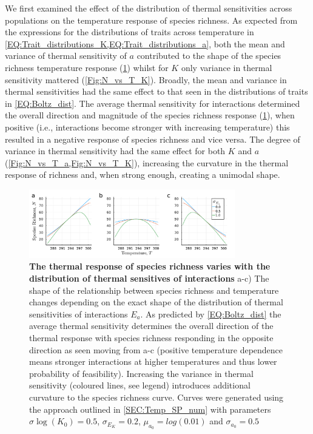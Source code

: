 \documentclass{article}
\begin{document}
We first examined the effect of the distribution of thermal sensitivities across populations on the temperature response of species richness. As expected from the expressions for the distributions of traits across temperature in \cref{EQ:Trait_distributions_K,EQ:Trait_distributions_a}, both the mean and variance of thermal sensitivity of $a$ contributed to the shape of the species richness temperature response (\cref{Fig:N_vs_T_a}) whilst for $K$ only variance in thermal sensitivity mattered (\cref{Fig:N_vs_T_K}). Broadly, the mean and variance in thermal sensitivities had the same effect to that seen in the distributions of traits in \cref{EQ:Boltz_dist}. The average thermal sensitivity for interactions determined the overall direction and magnitude of the species richness response (\cref{Fig:N_vs_T_a}), when positive (i.e., interactions become stronger with increasing temperature) this resulted in a negative response of species richness and vice versa. The degree of variance in thermal sensitivity had the same effect for both $K$ and $a$ (\cref{Fig:N_vs_T_a,Fig:N_vs_T_K}), increasing the curvature in the thermal response of richness and, when strong enough, creating a unimodal shape.

\begin{figure}
    \centering
    \includegraphics[width=0.8\textwidth]{docs/Figures/Fig_Nsp_Temp_a.pdf}
    \caption{\textbf{The thermal response of species richness  varies with the distribution of thermal sensitives of interactions} a-c) The shape of the relationship between species richness and temperature changes depending on the exact shape of the distribution of thermal sensitivities of interactions $E_a$. As predicted by \cref{EQ:Boltz_dist} the average thermal sensitivity determines the overall direction of the thermal response with species richness responding in the opposite direction as seen moving from a-c (positive temperature dependence means stronger interactions at higher temperatures and thus lower probability of feasibility). Increasing the variance in thermal sensitivity (coloured lines, see legend) introduces additional curvature to the species richness curve. Curves were generated using the approach outlined in \cref{SEC:Temp_SP_num} with parameters $\sigma{\log(K_0)} = 0.5$, $\sigma_{E_K} = 0.2$, $\mu_{a_0} = log(0.01)$ and  $\sigma_{a_0} = 0.5$}
    \label{Fig:N_vs_T_a}
\end{figure}
\end{document}
